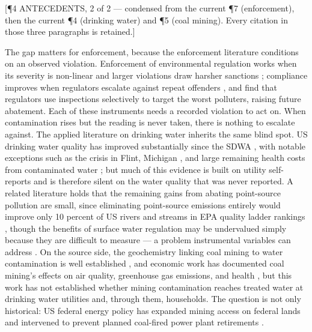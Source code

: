 \documentclass[12pt]{article}
\newcommand{\annot}[1]{%
  \par\nobreak\vspace{0.35em}%
  {\footnotesize\sffamily\color{annotcol}\raggedright #1\par}%
  \nobreak\vspace{-0.35em}\nobreak}
\begin{document}
\annot{[\P4 \textbullet{} ANTECEDENTS, 2 of 2 --- condensed from the current \P7
(enforcement), then the current \P4 (drinking water) and \P5 (coal mining). Every
citation in those three paragraphs is retained.]}
The gap matters for enforcement, because the enforcement literature conditions on an
observed violation. Enforcement of environmental regulation works when its severity is
non-linear and larger violations draw harsher sanctions
\parencite{shimshack2014economics, harford1987self}; compliance improves when regulators
escalate against repeat offenders \parencite{blundell2020escalation, blundell2020threats},
and \textcite{duflo2018value} find that regulators use inspections selectively to target
the worst polluters, raising future abatement. Each of these instruments needs a recorded
violation to act on. When contamination rises but the reading is never taken, there is
nothing to escalate against. The applied literature on drinking water inherits the same
blind spot. US drinking water quality has improved substantially since the SDWA
\parencite{keiser2019consequences}, with notable exceptions such as the crisis in Flint,
Michigan \parencite{christensen2023flint}, and large remaining health costs from
contaminated water \parencite{hill2017shale, keiser2019us, disalvo2024drinking,
marcus2025testing}; but much of this evidence is built on utility self-reports and is
therefore silent on the water quality that was never reported. A related literature holds
that the remaining gains from abating point-source pollution are small, since eliminating
point-source emissions entirely would improve only 10 percent of US rivers and streams in
EPA quality ladder rankings \parencite{bingham2000}, though the benefits of surface water
regulation may be undervalued simply because they are difficult to measure --- a problem
instrumental variables can address \parencite{keiser2019missing}. On the source side, the
geochemistry linking coal mining to water contamination is well established
\parencite{skousen2019acid, akcil2006acid}, and economic work has documented coal mining's
effects on air quality, greenhouse gas emissions, and health
\parencite{muller2011environmental, parfitt2024there}, but this work has not established
whether mining contamination reaches treated water at drinking water utilities and,
through them, households. The question is not only historical: US federal energy policy
has expanded mining access on federal lands and intervened to prevent planned coal-fired
power plant retirements \parencite{Trump2025EO14260, Trump2025EO14261,
Trump2025Proc10914, Daly2025CoalMining}.
\end{document}
